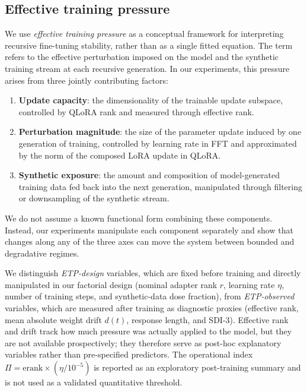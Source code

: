 \documentclass[a4paper,fleqn]{cas-dc}
\newif\ifshowchanges
\newcommand{\rev}[1]{\ifshowchanges{\color{blue}#1}\else{#1}\fi}
\begin{document}
\subsection{Effective training pressure}\label{sec:pressure}

We use \textit{effective training pressure} as a conceptual framework for
interpreting recursive fine-tuning stability, rather than as a single fitted
equation. The term refers to the effective perturbation imposed on the model and
the synthetic training stream at each recursive generation. In our experiments,
this pressure arises from three jointly contributing factors:

\begin{enumerate}
    \item \textbf{Update capacity}: the dimensionality of the trainable update
    subspace, controlled by QLoRA rank and measured through effective rank.

    \item \textbf{Perturbation magnitude}: the size of the parameter update
    induced by one generation of training, controlled by learning rate in FFT and
    approximated by the norm of the composed LoRA update in QLoRA.

    \item \textbf{Synthetic exposure}: the amount and composition of
    model-generated training data fed back into the next generation, manipulated
    through filtering or downsampling of the synthetic stream.
\end{enumerate}

We do not assume a known functional form combining these components. Instead,
our experiments manipulate each component separately and show that changes along
any of the three axes can move the system between bounded and degradative
regimes.

\rev{We distinguish \emph{ETP-design} variables, which are fixed before training and
directly manipulated in our factorial design (nominal adapter rank $r$, learning
rate $\eta$, number of training steps, and synthetic-data dose fraction), from
\emph{ETP-observed} variables, which are measured after training as diagnostic
proxies (effective rank, mean absolute weight drift $d(t)$, response length, and
SDI-3). Effective rank and drift track how much pressure was actually applied to
the model, but they are not available prospectively; they therefore serve as
post-hoc explanatory variables rather than pre-specified predictors. The
operational index $\Pi = \mathrm{erank} \times (\eta / 10^{-5})$ is reported as
an exploratory post-training summary and is not used as a validated quantitative
threshold.}
\end{document}
